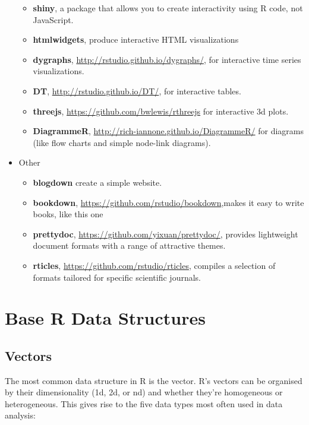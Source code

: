 \documentclass[]{book}
\providecommand{\tightlist}{%
  \setlength{\itemsep}{0pt}\setlength{\parskip}{0pt}}
\theoremstyle{definition}
\theoremstyle{definition}
\theoremstyle{definition}
\theoremstyle{remark}
\begin{document}
\begin{itemize}
  \begin{itemize}
  \tightlist
  \item
    \textbf{shiny}, a package that allows you to create interactivity
    using R code, not JavaScript.
  \item
    \textbf{htmlwidgets}, produce interactive HTML visualizations
  \item
    \textbf{dygraphs}, \url{http://rstudio.github.io/dygraphs/}, for
    interactive time series visualizations.
  \item
    \textbf{DT}, \url{http://rstudio.github.io/DT/}, for interactive
    tables.
  \item
    \textbf{threejs}, \url{https://github.com/bwlewis/rthreejs} for
    interactive 3d plots.
  \item
    \textbf{DiagrammeR}, \url{http://rich-iannone.github.io/DiagrammeR/}
    for diagrams (like flow charts and simple node-link diagrams).
  \end{itemize}
\item
  Other

  \begin{itemize}
  \tightlist
  \item
    \textbf{blogdown} create a simple website.
  \item
    \textbf{bookdown}, \url{https://github.com/rstudio/bookdown},makes
    it easy to write books, like this one
  \item
    \textbf{prettydoc}, \url{https://github.com/yixuan/prettydoc/},
    provides lightweight document formats with a range of attractive
    themes.
  \item
    \textbf{rticles}, \url{https://github.com/rstudio/rticles}, compiles
    a selection of formats tailored for specific scientific journals.
  \end{itemize}
\end{itemize}

\hypertarget{base-r-data-structures}{%
\chapter{Base R Data Structures}\label{base-r-data-structures}}

\hypertarget{vectors}{%
\section{Vectors}\label{vectors}}

The most common data structure in R is the vector. R's vectors can be
organised by their dimensionality (1d, 2d, or nd) and whether they're
homogeneous or heterogeneous. This gives rise to the five data types
most often used in data analysis:
\end{document}
